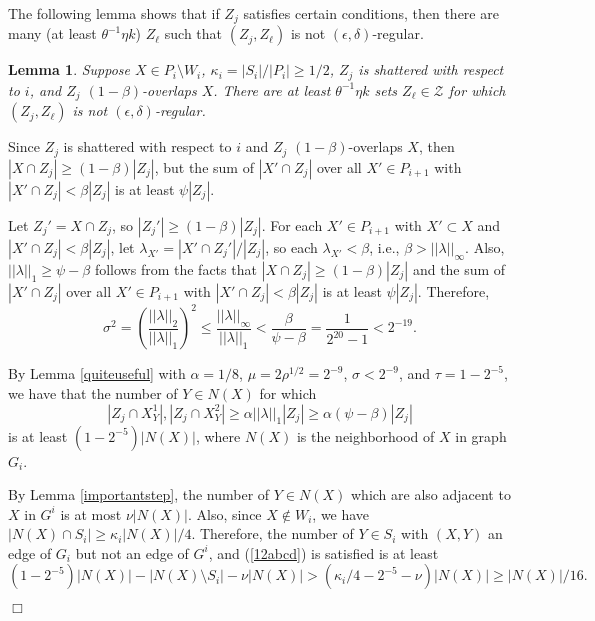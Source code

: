 \documentclass[11pt]{article}
\newtheorem{lemma}{Lemma}[section]
\newenvironment{proof}
      {\medskip\noindent{\bf Proof:}\hspace{1mm}}
      {\hfill$\Box$\medskip}
\begin{document}
The following lemma shows that if $Z_j$ satisfies certain conditions, then
there are many (at least $\theta^{-1}\eta k$) $Z_{\ell}$ such that
$(Z_j,Z_{\ell})$ is
not $(\epsilon,\delta)$-regular.

\begin{lemma}\label{mainclaim2} Suppose $X \in P_i \setminus W_i$,
$\kappa_i=|S_i|/|P_i| \geq 1/2$, $Z_j$ is shattered with respect to $i$, and
$Z_j$ $(1-\beta)$-overlaps $X$. There are at least $\theta^{-1}\eta k$ sets
$Z_{\ell} \in \mathcal{Z}$ for which $(Z_j,Z_{\ell})$ is not $(\epsilon,\delta)$-regular.
\end{lemma}
\begin{proof}
Since $Z_j$ is shattered with respect to $i$ and $Z_j$ $(1-\beta)$-overlaps
$X$, then $|X \cap Z_j| \geq (1-\beta)|Z_j|$, but the sum of $|X' \cap Z_j|$
over all $X' \in P_{i+1}$ with
$|X' \cap Z_j| <\beta|Z_j|$ is at least $\psi|Z_j|$.

Let $Z_j'= X \cap Z_j$, so $|Z_j'| \geq (1-\beta)|Z_j|$. For each $X' \in
P_{i+1}$ with $X' \subset X$ and $|X' \cap Z_j| <\beta|Z_j|$, let
$\lambda_{X'}=|X' \cap Z_j'|/|Z_j|$, so each
$\lambda_{X'}<\beta$, i.e.,
$\beta>||\lambda||_{\infty}$. Also, $||\lambda||_1 \geq \psi-\beta$ follows from the facts that $|X \cap Z_j| \geq (1-\beta)|Z_j|$ and the sum of $|X' \cap Z_j|$ over all $X' \in P_{i+1}$ with  $|X' \cap Z_j| <\beta|Z_j|$ is at least $\psi|Z_j|$. Therefore,
$$\sigma^2=\left(\frac{||\lambda||_2}{||\lambda||_1}\right)^2 \leq
\frac{||\lambda||_{\infty}}{||\lambda||_1} < \frac{\beta}{\psi-\beta}=\frac{1}{2^{20}-1} < 2^{-19}.$$

By Lemma \ref{quiteuseful} with $\alpha=1/8$, $\mu=2\rho^{1/2}=2^{-9}$,
$\sigma<2^{-9}$, and
$\tau=1-2^{-5}$, we have that the number of $Y \in N(X)$
for which \begin{equation}\label{12abcd} |Z_j \cap X^1_Y|,|Z_j \cap X^2_Y| \geq
\alpha||\lambda||_1|Z_j| \geq
\alpha(\psi-\beta)|Z_j|\end{equation} is at least $(1-2^{-5})|N(X)|$, where
$N(X)$ is
the neighborhood of $X$ in graph $G_i$. 

By Lemma \ref{importantstep}, the
number of $Y \in N(X)$ which are also adjacent to $X$ in $G^i$ is at most $\nu|N(X)|$.
Also, since $X \not \in W_i$, we have $|N(X) \cap S_i| \geq \kappa_i|N(X)|/4$.
Therefore, the number of $Y \in S_i$ with $(X,Y)$ an edge of $G_i$ but not an
edge
of $G^i$, and (\ref{12abcd}) is satisfied is at least $$(1-2^{-5}) |N(X)|-|N(X)
\setminus
S_i|-\nu|N(X)| > (\kappa_i/4-2^{-5}-\nu)|N(X)| \geq |N(X)|/16.$$


\end{proof}
\end{document}
